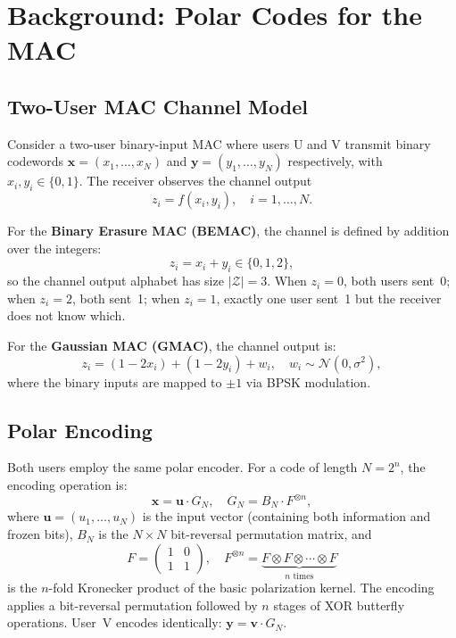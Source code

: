 \documentclass[11pt,a4paper]{article}
\newcommand{\GN}{G_N}
\newcommand{\BN}{B_N}
\newcommand{\Fkron}{F^{\otimes n}}
\begin{document}
\section{Background: Polar Codes for the MAC}
\label{sec:background}

\subsection{Two-User MAC Channel Model}

Consider a two-user binary-input MAC where users U and V transmit binary codewords $\bm{x} = (x_1, \ldots, x_N)$ and $\bm{y} = (y_1, \ldots, y_N)$ respectively, with $x_i, y_i \in \{0, 1\}$. The receiver observes the channel output
\begin{equation}
    z_i = f(x_i, y_i), \quad i = 1, \ldots, N.
\end{equation}

For the \textbf{Binary Erasure MAC (BEMAC)}, the channel is defined by addition over the integers:
\begin{equation}
    z_i = x_i + y_i \in \{0, 1, 2\},
    \label{eq:bemac}
\end{equation}
so the channel output alphabet has size $|\mathcal{Z}| = 3$. When $z_i = 0$, both users sent~0; when $z_i = 2$, both sent~1; when $z_i = 1$, exactly one user sent~1 but the receiver does not know which.

For the \textbf{Gaussian MAC (GMAC)}, the channel output is:
\begin{equation}
    z_i = (1 - 2x_i) + (1 - 2y_i) + w_i, \quad w_i \sim \mathcal{N}(0, \sigma^2),
\end{equation}
where the binary inputs are mapped to $\pm 1$ via BPSK modulation.

\subsection{Polar Encoding}

Both users employ the same polar encoder. For a code of length $N = 2^n$, the encoding operation is:
\begin{equation}
    \bm{x} = \bm{u} \cdot \GN, \quad \GN = \BN \cdot \Fkron,
\end{equation}
where $\bm{u} = (u_1, \ldots, u_N)$ is the input vector (containing both information and frozen bits), $\BN$ is the $N \times N$ bit-reversal permutation matrix, and
\begin{equation}
    F = \begin{pmatrix} 1 & 0 \\ 1 & 1 \end{pmatrix}, \quad \Fkron = \underbrace{F \otimes F \otimes \cdots \otimes F}_{n \text{ times}}
\end{equation}
is the $n$-fold Kronecker product of the basic polarization kernel. The encoding applies a bit-reversal permutation followed by $n$ stages of XOR butterfly operations. User~V encodes identically: $\bm{y} = \bm{v} \cdot \GN$.
\end{document}
